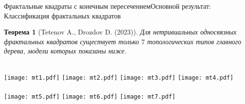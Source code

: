\documentclass[aspectratio=1610, 10pt, notheorems]{beamer}
\newtheorem{theorem}     {Теорема}
\begin{document}
\begin{frame}{Фрактальные квадраты с конечным пересечением}{Основной результат: Классификация фрактальных квадратов}

\begin{theorem}[Tetenov A., Drozdov D.  (2023)]
Для нетривиальных односвязных фрактальных квадратов существует только $7$ топологических типов главного дерева, модели которых показаны ниже.
\end{theorem}
\;\\
\texttt{[image: mt1.pdf]}
\hfill
\texttt{[image: mt2.pdf]}
\hfill
\texttt{[image: mt3.pdf]}
\hfill
\texttt{[image: mt4.pdf]}\\ \;\\
\texttt{[image: mt5.pdf]}
\hfill
\texttt{[image: mt6.pdf]}
\hfill
\texttt{[image: mt7.pdf]}
\end{frame}
\end{document}
